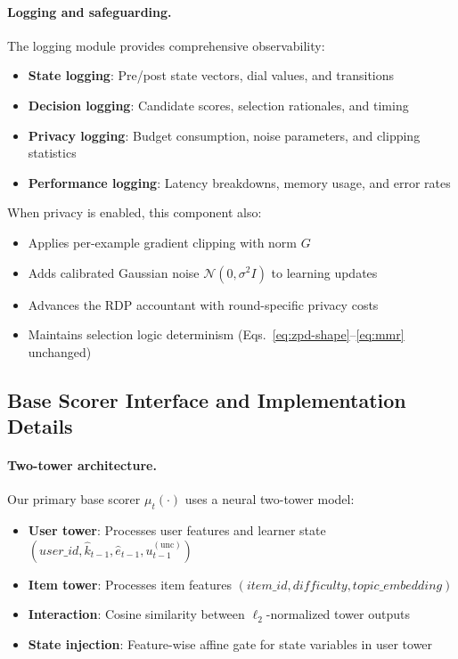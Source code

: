 \paragraph{Logging and safeguarding.} The logging module provides comprehensive observability:
\begin{itemize}
  \item \textbf{State logging}: Pre/post state vectors, dial values, and transitions
  \item \textbf{Decision logging}: Candidate scores, selection rationales, and timing
  \item \textbf{Privacy logging}: Budget consumption, noise parameters, and clipping statistics
  \item \textbf{Performance logging}: Latency breakdowns, memory usage, and error rates
\end{itemize}

When privacy is enabled, this component also:
\begin{itemize}
  \item Applies per-example gradient clipping with norm $G$
  \item Adds calibrated Gaussian noise $\mathcal{N}(0, \sigma^2 I)$ to learning updates
  \item Advances the RDP accountant with round-specific privacy costs
  \item Maintains selection logic determinism (Eqs.~\eqref{eq:zpd-shape}--\eqref{eq:mmr} unchanged)
\end{itemize}

\subsection{Base Scorer Interface and Implementation Details}
\label{app:base-scorer}

\paragraph{Two-tower architecture.} Our primary base scorer $\mu_t(\cdot)$ uses a neural two-tower model:
\begin{itemize}
  \item \textbf{User tower}: Processes user features and learner state $(user\_id, \widehat{k}_{t-1}, \widehat{e}_{t-1}, u_{t-1}^{(\mathrm{unc})})$
  \item \textbf{Item tower}: Processes item features $(item\_id, difficulty, topic\_embedding)$
  \item \textbf{Interaction}: Cosine similarity between $\ell_2$-normalized tower outputs
  \item \textbf{State injection}: Feature-wise affine gate for state variables in user tower
\end{itemize}

